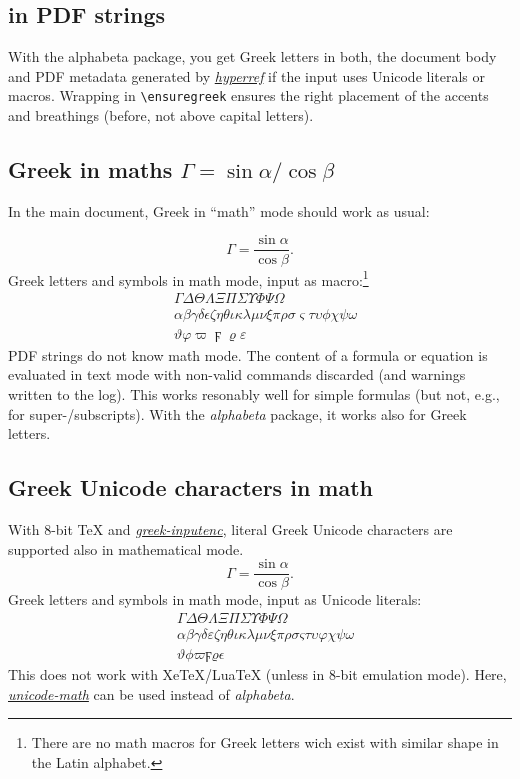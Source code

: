\documentclass[a4paper]{scrartcl}
\newcommand{\pkgref}[1]{\emph{\href{https://ctan.org/pkg/#1}{#1}}}
\begin{document}
\subsection{\ensuregreek{%
  \<\Epsilon\lambda\lambda\eta\nu\iota\kappa\'\alpha} in PDF strings}

With the alphabeta package, you get Greek letters in both, the document body
and PDF metadata generated by \pkgref{hyperref} if the input uses Unicode
literals or macros. Wrapping in \verb+\ensuregreek+ ensures the right
placement of the accents and breathings (before, not above capital letters).


\subsection{Greek in maths $\Gamma = \sin\alpha / \cos{\beta}$}

In the main document, Greek in ``math'' mode should work as usual:

\[\Gamma = \frac{\sin\alpha}{\cos{\beta}}.
\]
Greek letters and symbols in math mode, input as macro:\footnote{
  There are no math macros for Greek letters wich exist
  with similar shape in the Latin alphabet.}
\begin{align*}
  &
  \Gamma{} \Delta{}
  \Theta{}
  \Lambda{}
  \Xi{}
  \Pi{}
  \Sigma{}
  \Upsilon{} \Phi{}
  \Psi{} \Omega{}
\\&
  \alpha{} \beta{} \gamma{} \delta{} \epsilon{} \zeta{} \eta{} \theta{}
  \iota{} \kappa{} \lambda{} \mu{} \nu{} \xi{}
  \pi{} \rho{}
  \sigma{} \varsigma{} \tau{} \upsilon{} \phi{} \chi{} \psi{} \omega{}
\\&
  \vartheta \varphi \varpi \digamma{} \varrho \varepsilon
\end{align*}
%
PDF strings do not know math mode. The content of a formula or equation is
evaluated in text mode with non-valid commands discarded (and warnings
written to the log). This works resonably well for simple formulas (but not,
e.g., for super-/subscripts). With the \emph{alphabeta} package, it works
also for Greek letters.


\subsection{Greek Unicode characters in math}

With 8-bit TeX and \pkgref{greek-inputenc}, literal Greek Unicode characters
are supported also in mathematical mode.
%
\ifdefined\DeclareUnicodeCharacter
  \[
       Γ = \frac{\sin α}{\cos β}.
  \]
  Greek letters and symbols in math mode, input as Unicode literals:
  \begin{align*}
               & Γ ΔΘΛΞΠΣΥ ΦΨ Ω \\
                 & αβγδεζηθικλμνξπρσςτυφχψω \\
               & ϑϕϖϝϱϵ
  \end{align*}
\fi
This does not work with XeTeX/LuaTeX (unless in 8-bit emulation mode).
Here, \pkgref{unicode-math} can be used instead of \emph{alphabeta}.
\end{document}
